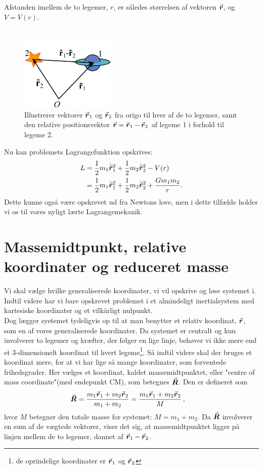 Afstanden imellem de to legemer, $r$, er således størrelsen af vektoren ${\vec{\boldsymbol{r}}}$, og $V=V(r)$. \\ \\
%
\begin{figure}[h!]
\centering
	\includegraphics[width = 0.4\textwidth]{Planetbevaegelse/relativkoordinat_planet.pdf}
	\caption{Illustrerer vektorer ${\vec{\boldsymbol{r}}}_1$ og ${\vec{\boldsymbol{r}}}_2$ fra origo til hver af de to legemer, samt den relative positionsvektor ${\vec{\boldsymbol{r}}} = {\vec{\boldsymbol{r}}}_1 - {\vec{\boldsymbol{r}}}_2$ af legeme 1 i forhold til legeme 2.}
	\label{fig:planet_relativ}
\end{figure}
Nu kan problemets Lagrangefunktion opskrives:
\begin{equation}
\begin{aligned}
	L &= \frac{1}{2} m_1 \dot{{\vec{\boldsymbol{r}}}}_1^2 + \frac{1}{2} m_2 \dot{{\vec{\boldsymbol{r}}}}_2^2 - V(r) \\
	&= \frac{1}{2} m_1 \dot{{\vec{\boldsymbol{r}}}}_1^2 + \frac{1}{2} m_2 \dot{{\vec{\boldsymbol{r}}}}_2^2 + \frac{Gm_1m_2}{r}.
\end{aligned}
\end{equation}
Dette kunne også være opskrevet ud fra Newtons love, men i dette tilfælde holder vi os til vores nyligt lærte Lagrangemekanik.


\section{Massemidtpunkt, relative koordinater og reduceret masse}
Vi skal vælge hvilke generaliserede koordinater, vi vil opskrive og løse systemet i. Indtil videre har vi bare opskrevet problemet i et almindeligt inertialsystem med kartesiske koordinater og et vilkårligt nulpunkt. \\
%
Dog lægger systemet tydeligvis op til at man benytter et relativ koordinat, ${\vec{\boldsymbol{r}}}$, som en af vores generaliserede koordinater. Da systemet er centralt og kun involverer to legemer og kræfter, der følger en lige linje, behøver vi ikke mere end et 3-dimensionelt koordinat til hvert legeme\footnote{de oprindelige koordinater er ${\vec{\boldsymbol{r}}}_{\text{1}}$ og ${\vec{\boldsymbol{r}}}_{\text{2}}$}. Så indtil videre skal der bruges et koordinat mere, for at vi har lige så mange koordinater, som forventede frihedsgrader. Her vælges et koordinat, kaldet massemidtpunktet, eller "centre of mass coordinate"\;(med endepunkt CM), som betegnes ${\vec{\boldsymbol{R}}}$. Den er defineret som
\begin{align}\label{CM}
	{\vec{\boldsymbol{R}}} &= \frac{m_1 {\vec{\boldsymbol{r}}}_{\text{1}} + m_2 {\vec{\boldsymbol{r}}}_{\text{2}}}{m_1 + m_2} = \frac{m_1 {\vec{\boldsymbol{r}}}_{\text{1}} + m_2 {\vec{\boldsymbol{r}}}_{\text{2}}}{M} \, ,
\end{align}
hvor $M$ betegner den totale masse for systemet: $M = m_1 + m_2$. Da ${\vec{\boldsymbol{R}}}$ involverer en sum af de vægtede vektorer, viser det sig, at massemidtpunktet ligger på linjen mellem de to legemer, dannet af ${\vec{\boldsymbol{r}}}_{\text{1}} - {\vec{\boldsymbol{r}}}_{\text{2}}$. \\

